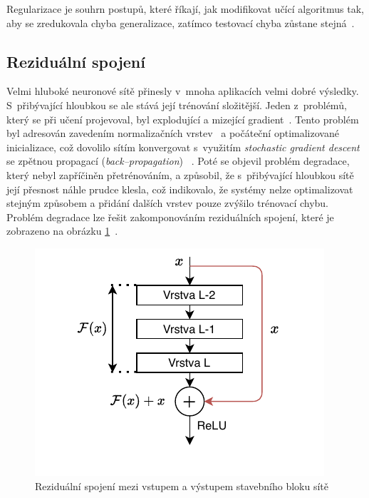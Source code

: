 
Regularizace je souhrn postupů, které říkají, jak modifikovat učící algoritmus tak, aby se zredukovala chyba generalizace, zatímco testovací chyba zůstane stejná~\cite{mitdeeplearning}.


\subsection{Reziduální spojení}
Velmi hluboké neuronové sítě přinesly v~mnoha aplikacích velmi dobré výsledky. S~přibývající hloubkou se ale stává její trénování složitější. Jeden z~problémů, který se při učení projevoval, byl explodující a mizející gradient~\cite{279181}. Tento problém byl adresován zavedením normalizačních vrstev~\cite{ioffe2015batch} a počáteční optimalizované inicializace, což dovolilo sítím konvergovat s~využitím \textit{stochastic gradient descent} se zpětnou propagací (\textit{back--propagation})~ \cite{6795724}. Poté se objevil problém degradace, který nebyl zapříčiněn přetrénováním, a způsobil, že s~přibývající hloubkou sítě její přesnost náhle prudce klesla, což indikovalo, že systémy nelze optimalizovat stejným způsobem a přidání dalších vrstev pouze zvýšilo trénovací chybu. Problém degradace lze řešit zakomponováním reziduálních spojení, které je zobrazeno na obrázku \ref{fig:residualconnection}~\cite{he2015deep}.

\begin{figure}[H]
    \centering
    \includegraphics[scale=1.15]{obrazky-figures/residual_connection.pdf}
    \caption{\label{fig:residualconnection}Reziduální spojení mezi vstupem a výstupem stavebního bloku sítě~\cite{he2015deep}}
\end{figure}

